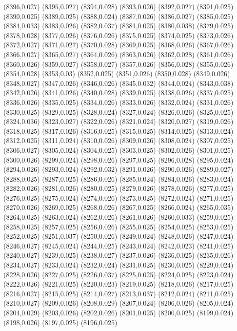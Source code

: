 (8396,0.027)
(8395,0.027)
(8394,0.028)
(8393,0.026)
(8392,0.027)
(8391,0.025)
(8390,0.025)
(8389,0.025)
(8388,0.024)
(8387,0.026)
(8386,0.027)
(8385,0.025)
(8384,0.033)
(8383,0.026)
(8382,0.037)
(8381,0.025)
(8380,0.038)
(8379,0.025)
(8378,0.028)
(8377,0.026)
(8376,0.026)
(8375,0.025)
(8374,0.025)
(8373,0.026)
(8372,0.027)
(8371,0.027)
(8370,0.028)
(8369,0.025)
(8368,0.026)
(8367,0.026)
(8366,0.027)
(8365,0.027)
(8364,0.026)
(8363,0.026)
(8362,0.028)
(8361,0.026)
(8360,0.026)
(8359,0.027)
(8358,0.027)
(8357,0.026)
(8356,0.028)
(8355,0.026)
(8354,0.028)
(8353,0.03)
(8352,0.025)
(8351,0.026)
(8350,0.028)
(8349,0.026)
(8348,0.027)
(8347,0.026)
(8346,0.026)
(8345,0.032)
(8344,0.024)
(8343,0.038)
(8342,0.026)
(8341,0.026)
(8340,0.028)
(8339,0.025)
(8338,0.026)
(8337,0.025)
(8336,0.026)
(8335,0.025)
(8334,0.026)
(8333,0.026)
(8332,0.024)
(8331,0.026)
(8330,0.025)
(8329,0.025)
(8328,0.024)
(8327,0.024)
(8326,0.026)
(8325,0.025)
(8324,0.036)
(8323,0.027)
(8322,0.026)
(8321,0.024)
(8320,0.027)
(8319,0.026)
(8318,0.025)
(8317,0.026)
(8316,0.025)
(8315,0.025)
(8314,0.025)
(8313,0.024)
(8312,0.025)
(8311,0.024)
(8310,0.026)
(8309,0.026)
(8308,0.024)
(8307,0.025)
(8306,0.027)
(8305,0.024)
(8304,0.025)
(8303,0.025)
(8302,0.026)
(8301,0.025)
(8300,0.026)
(8299,0.024)
(8298,0.026)
(8297,0.025)
(8296,0.028)
(8295,0.024)
(8294,0.026)
(8293,0.024)
(8292,0.032)
(8291,0.026)
(8290,0.026)
(8289,0.027)
(8288,0.025)
(8287,0.025)
(8286,0.026)
(8285,0.024)
(8284,0.026)
(8283,0.024)
(8282,0.026)
(8281,0.026)
(8280,0.025)
(8279,0.026)
(8278,0.026)
(8277,0.025)
(8276,0.025)
(8275,0.024)
(8274,0.026)
(8273,0.025)
(8272,0.024)
(8271,0.025)
(8270,0.026)
(8269,0.025)
(8268,0.026)
(8267,0.025)
(8266,0.024)
(8265,0.035)
(8264,0.025)
(8263,0.024)
(8262,0.026)
(8261,0.026)
(8260,0.033)
(8259,0.025)
(8258,0.025)
(8257,0.025)
(8256,0.026)
(8255,0.025)
(8254,0.025)
(8253,0.025)
(8252,0.025)
(8251,0.037)
(8250,0.026)
(8249,0.024)
(8248,0.026)
(8247,0.024)
(8246,0.027)
(8245,0.024)
(8244,0.025)
(8243,0.024)
(8242,0.023)
(8241,0.025)
(8240,0.027)
(8239,0.025)
(8238,0.027)
(8237,0.026)
(8236,0.025)
(8235,0.026)
(8234,0.027)
(8233,0.024)
(8232,0.024)
(8231,0.025)
(8230,0.025)
(8229,0.024)
(8228,0.026)
(8227,0.025)
(8226,0.037)
(8225,0.025)
(8224,0.025)
(8223,0.024)
(8222,0.026)
(8221,0.025)
(8220,0.023)
(8219,0.025)
(8218,0.026)
(8217,0.025)
(8216,0.027)
(8215,0.025)
(8214,0.027)
(8213,0.037)
(8212,0.024)
(8211,0.025)
(8210,0.027)
(8209,0.026)
(8208,0.029)
(8207,0.024)
(8206,0.026)
(8205,0.024)
(8204,0.029)
(8203,0.026)
(8202,0.026)
(8201,0.025)
(8200,0.025)
(8199,0.024)
(8198,0.026)
(8197,0.025)
(8196,0.025)
